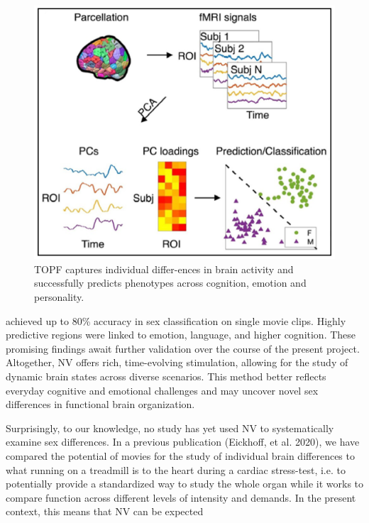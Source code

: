 \documentclass[11pt,a4paper]{article}
\begin{document}
\begin{figure} %
  \vspace{-10pt} %
  \includegraphics[width=\linewidth]{topf_neu.png}
  \caption{TOPF captures individual differ-ences in brain activity and successfully predicts phenotypes across cognition, emotion and personality.}
  \label{fig:topf}
\end{figure}
achieved up to 80\% accuracy in sex classification on single movie clips. Highly predictive regions were 
linked to emotion, language, and higher cognition. These promising findings await further validation over 
the course of the present project. Altogether, NV offers rich, time-evolving stimulation, allowing for the 
study of dynamic brain states across diverse scenarios. This method better reflects everyday cognitive and 
emotional challenges and may uncover novel sex differences in functional brain organization.
\par\vspace{-1\parskip}\noindent
Surprisingly, to our knowledge, no study has yet used NV to systematically examine sex differences. 
In a previous publication (Eickhoff, et al. 2020), we have compared the potential of movies for the study of 
individual brain differences to what running on a treadmill is to the heart during a cardiac stress-test, 
i.e. to potentially provide a standardized way to study the whole organ while it works to compare function 
across different levels of intensity and demands. In the present context, this means that NV can be expected 
\end{document}
